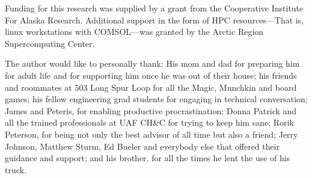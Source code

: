 Funding for this research was supplied by a grant from the Cooperative Institute
For Alaska Research. Additional support in the form of HPC resources---That is, 
linux workstations with COMSOL---was granted by the Arctic Region Supercomputing
Center.

The author would like to personally thank: His mom and dad for preparing him for
adult life and for supporting him once he was out of their house;
his friends and roommates at 503 Long Spur Loop for all the Magic, Munchkin and
board games;
his fellow engineering grad students for engaging in technical conversation;
James and Peteris, for enabling productive procrastination;
Donna Patrick and all the trained professionals at UAF CH\&C for trying to keep him sane;
Rorik Peterson, for being not only the best advisor of all time but also a friend;
Jerry Johnson, Matthew Sturm, Ed Bueler and everybody else that offered their guidance and support; 
and his brother, for all the times he lent the use of his truck.
